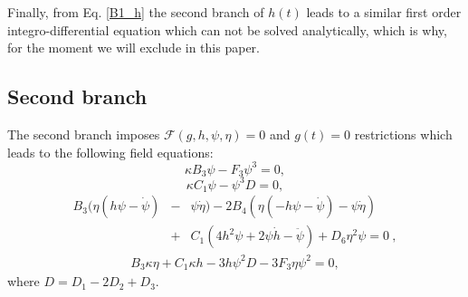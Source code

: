 Finally, from Eq. \eqref{B1_h} the second branch of $h(t)$ leads to a similar first order integro-differential equation 
which can not be solved analytically, which is why, for the moment we will exclude in this paper.

\subsection{Second branch}
\label{sec:second_branch}

The second branch imposes $\mathcal{F}(g,h,\psi,\eta)  = 0$ and $g(t) = 0$ restrictions which leads to the following field equations:
\begin{dmath}
    \label{Feq_B2_1}
    \kappa B_3 \psi - F_3\psi^3= 0,
\end{dmath}
\begin{dmath}
    \label{Feq_B2_3}
    \kappa C_1\psi - \psi^3 D = 0 ,
\end{dmath}
\begin{eqnarray}
    \label{Feq_B2_4}
    B_3(\eta(h\psi -\dot{\psi}) &-&\psi\dot{\eta}) - 2B_4(\eta(-h\psi - \dot{\psi}) - \psi\dot{\eta})   \\ &+& C_1(4h^2\psi + 2\psi\dot{h} -\ddot{\psi}) + D_6\eta^2\psi = 0 \ ,\nonumber 
\end{eqnarray}
\begin{eqnarray}
    \label{Feq_B2_5}
    B_3\kappa\eta + C_1\kappa h - 3h\psi^2 D - 3F_3\eta\psi^2 = 0,
\end{eqnarray}
where $D = D_1 - 2D_2 + D_3$.

